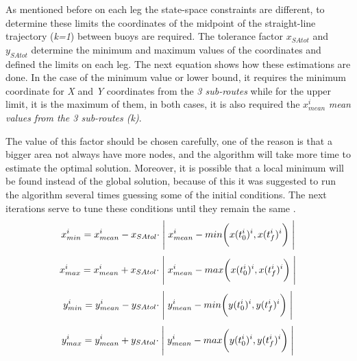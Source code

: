  As mentioned before on each leg the state-space constraints are different, to determine these limits the coordinates of the midpoint of the straight-line trajectory (\textit{k=1}) between buoys are required. The tolerance factor $x_{SAtot}$ and $y_{SAtot}$ determine the minimum and maximum values of the coordinates and defined the limits on each leg. The next equation shows how these estimations are done. In the case of the minimum value or lower bound, it requires the minimum coordinate for \textit{X} and \textit{Y} coordinates from the \textit{3 sub-routes} while for the upper limit, it is the maximum of them, in both cases, it is also required the $x_{mean}^{i}$ \textit{mean values from the 3 sub-routes (k)}. \par 
 
 The value of this factor should be chosen carefully, one of the reason is that a bigger area not always have more nodes, and the algorithm will take more time to estimate the optimal solution. Moreover, it is possible that a local minimum will be found instead of the global solution, because of this it was suggested to run the algorithm several times guessing some of the initial conditions. The next iterations serve to tune these conditions until they remain the same \cite{philpott1993yacht}. %
\begin{equation} \label{eq:Xmin_SailArea}
    x_{min}^{i}=x_{mean}^{i} - x_{SAtol}\cdot \Biggm|  x_{mean}^{i} -  min \bigg( x(t_{0}^{i})^{i},x(t_{f}^{i})^{i} \bigg) \Biggm| 
\end{equation}
\begin{equation} \label{eq:Xmax_SailArea}
    x_{max}^{i}=x_{mean}^{i} + x_{SAtol}\cdot  \Biggm|  x_{mean}^{i} -  max \bigg( x(t_{0}^{i})^{i},x(t_{f}^{i})^{i} \bigg)  \Biggm| 
\end{equation}
\begin{equation} \label{eq:Ymin_SailArea}
    y_{min}^{i}=y_{mean}^{i} - y_{SAtol}\cdot \Biggm|  y_{mean}^{i} -  min \bigg( y(t_{0}^{i})^{i},y(t_{f}^{i})^{i} \bigg) \Biggm| 
\end{equation}
\begin{equation} \label{eq:Ymax_SailArea}
    y_{max}^{i} = y_{mean}^{i} + y_{SAtol}\cdot \Biggm|  y_{mean}^{i} -  max \bigg( y(t_{0}^{i})^{i},y(t_{f}^{i})^{i} \bigg) \Biggm| 
\end{equation}

